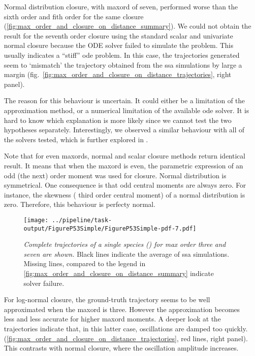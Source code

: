 Normal distribution closure, with \gls{maxord} of seven, performed worse than the sixth order and fith order for the same closure (\autoref{fig:max_order_and_closure_on_distance_summary}).
We could not obtain the result for the seventh order closure using the standard scalar and univariate normal closure
because the ODE solver failed to simulate the problem.
This usually indicates a ``stiff'' \gls{ode} problem.
In this case, the trajectories generated seem to `mismatch' the trajectory obtained from the \gls{ssa} simulations by
large a margin (fig.~\autoref{fig:max_order_and_closure_on_distance_trajectories}, right panel).

The reason for this behaviour is uncertain. It could either be a limitation of the approximation method, or a numerical limitation of the available \gls{ode} solver.
It is hard to know which explanation is more likely since we cannot test the two hypotheses separately.
Interestingly, we observed a similar behaviour with all of the solvers tested, which is further explored in .

Note that for even \glspl{maxord}, normal and scalar closure methods return identical result.
It means that when the \gls{maxord} is even,  the parametric expression of an odd (the next) order moment was used for closure.
Normal distribution is symmetrical. One consequence is that odd central moments are always zero.
For instance, the skewness (\ie{} third order central moment) of a normal distribution is zero.
Therefore, this behaviour is perfecty normal.



\begin{figure}
    \centering
    \texttt{[image: ../pipeline/task-output/FigureP53Simple/FigureP53Simple-pdf-7.pdf]}
    \caption{\emph{Complete trajectories of a single species (\pft) for max order three and seven are shown.} 
    Black lines indicate the average of \gls{ssa} simulations. 
    Missing lines, compared to the legend in \autoref{fig:max_order_and_closure_on_distance_summary} indicate solver failure.}
    \label{fig:max_order_and_closure_on_distance_trajectories}
\end{figure}

 
For log-normal closure, the ground-truth trajectory seems to be well approximated when the \gls{maxord} is three.
However the approximation becomes less and less accurate for higher \gls{maxord} moments.
A deeper look at the trajectories indicate that, in this latter case,
oscillations are damped too quickly. (\autoref{fig:max_order_and_closure_on_distance_trajectories}, red lines, right panel).
This contrasts with normal closure, where the oscillation amplitude increases.

